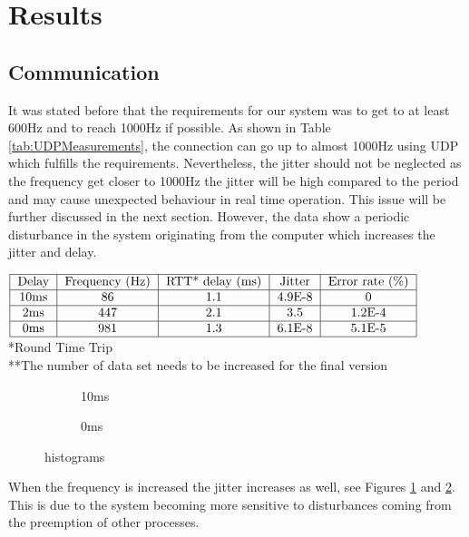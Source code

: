 \section{Results}

\subsection{Communication}

 It was stated before that the requirements for our system was to get to at least 600Hz and to reach 1000Hz if possible. As shown in Table \ref{tab:UDPMeasurements}, the connection can go up to almost 1000Hz using UDP which fulfills the requirements. Nevertheless, the jitter should not be neglected as the frequency get closer to 1000Hz the jitter will be high compared to the period and may cause unexpected behaviour in real time operation. This issue will be further discussed in the next section. However, the data show a periodic disturbance in the system originating from the computer which increases the jitter and delay. %


\begin{table}[h]
  $\begin{tabular}{|c|c|c|c|c|c|}
    \hline
    \text{Delay} & \text{Frequency (Hz)} & \text{RTT* delay (ms)} & \text{Jitter} & \text{Error rate (\%)}\\
    \hline
    10ms & 86 & 1.1 & 4.9E-8 & 0 \\
    \hline
    2ms & 447 & 2.1 & 3.5 & 1.2E-4 \\
    \hline
    0ms & 981 & 1.3 & 6.1E-8 & 5.1E-5 \\
    \hline
  \end{tabular}$
  *Round Time Trip\\
  **The number of data set needs to be increased for the final version
  \caption{UDP**}
  \label{tab:UDPMeasurements}
\end{table}



\begin{figure}[h]
  \centering
  \begin{subfigure}{.45\linewidth}
    \centering
   
    
    \caption{10ms}
    \label{fig:10ms}
  \end{subfigure}
  \begin{subfigure}{.45\linewidth}
    \centering

    
    \caption{0ms}
    \label{fig:0ms}
  \end{subfigure}
\caption{histograms}
\label{fig:histograms}
\end{figure}


When the frequency is increased the jitter increases as well, see Figures \ref{fig:10ms} and \ref{fig:0ms}. This is due to the system becoming more sensitive to disturbances coming from the preemption of other processes.



